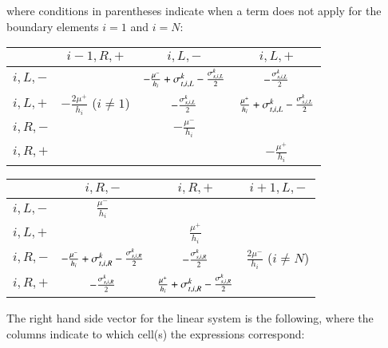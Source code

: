 where conditions in parentheses indicate when a term does not
apply for the boundary elements $i=1$ and $i=N$:
\begin{center}
\begin{tabular}{|l||c|c|c|}\hline
          & $i-1,R,+$ & $i,L,-$ & $i,L,+$\\\hline\hline
  $i,L,-$ &
          & $-\frac{\mu^-}{h_i} + \sigma_{t,i,L}^k - \frac{\sigma_{s,i,L}^k}{2}$
          & $-\frac{\sigma_{s,i,L}^k}{2}$ \\\hline
  $i,L,+$ & $-\frac{2\mu^+}{h_i}$ ($i\ne 1$)
          & $-\frac{\sigma_{s,i,L}^k}{2}$
          & $\frac{\mu^+}{h_i} + \sigma_{t,i,L}^k - \frac{\sigma_{s,i,L}^k}{2}$ \\\hline
  $i,R,-$ &
          & $-\frac{\mu^-}{h_i}$
          & \\\hline
  $i,R,+$ &
          &
          & $-\frac{\mu^+}{h_i}$ \\\hline
\end{tabular}
\end{center}
\begin{center}
\begin{tabular}{|l||c|c|c|}\hline
          & $i,R,-$ & $i,R,+$ & $i+1,L,-$\\\hline\hline
  $i,L,-$ & $\frac{\mu^-}{h_i}$
          &
          & \\\hline
  $i,L,+$ &
          & $\frac{\mu^+}{h_i}$
          & \\\hline
  $i,R,-$ & $-\frac{\mu^-}{h_i} + \sigma_{t,i,R}^k - \frac{\sigma_{s,i,R}^k}{2}$
          & $-\frac{\sigma_{s,i,R}^k}{2}$
          & $\frac{2\mu^-}{h_i}$ ($i\ne N$) \\\hline
  $i,R,+$ & $-\frac{\sigma_{s,i,R}^k}{2}$
          & $\frac{\mu^+}{h_i} + \sigma_{t,i,R}^k - \frac{\sigma_{s,i,R}^k}{2}$
          & \\\hline
\end{tabular}
\end{center}
The right hand side vector for the linear system is the following,
where the columns indicate to which cell(s) the expressions
correspond:

